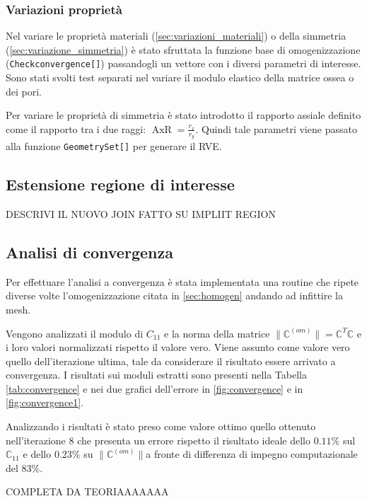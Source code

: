 \documentclass[a4paper,num-refs]{oup-contemporary}
\begin{document}
\subsubsection{Variazioni proprietà}

Nel variare le proprietà materiali (\cref{sec:variazioni_materiali}) o della simmetria (\cref{sec:variazione_simmetria}) è stato sfruttata la funzione base di omogenizzazione (\texttt{Checkconvergence[]}) passandogli un vettore con i diversi parametri di interesse. Sono stati svolti test separati nel variare il modulo elastico della matrice ossea o dei pori.

Per variare le proprietà di simmetria è stato introdotto il rapporto assiale definito come il rapporto tra i due raggi: $\operatorname{AxR}=\frac{r_{x}}{r_y}$. 
Quindi tale parametri viene passato alla funzione \texttt{GeometrySet[]} per generare il RVE. 

\subsection{Estensione regione di interesse}

DESCRIVI IL NUOVO JOIN FATTO SU IMPLIIT REGION


\subsection{Analisi di convergenza}
\label{sec:convergenza}

Per effettuare l'analisi a convergenza è stata implementata una routine che ripete diverse volte l'omogenizzazione citata in \cref{sec:homogen} andando ad infittire la mesh. 

Vengono analizzati il modulo di $C_{11}$ e la norma della matrice $\| \mathbb C^{(om)}\|=\mathbb C^T\mathbb C$ e i loro valori normalizzati rispetto il valore vero. Viene assunto come valore vero quello dell'iterazione ultima, tale da considerare il risultato essere arrivato a convergenza. 
I risultati sui moduli estratti sono presenti nella Tabella \ref{tab:convergence} e nei due grafici dell'errore in \cref{fig:convergence} e in \cref{fig:convergence1}.

Analizzando i risultati è stato preso come valore ottimo quello ottenuto nell'iterazione 8 che presenta un errore rispetto il risultato ideale dello $0.11\%$ sul $\mathbb C_{11}$ e dello $0.23\%$ su $\|\mathbb C^{(om)}\|$a fronte di differenza di impegno computazionale del $83\%$. 


COMPLETA DA TEORIAAAAAAA
\end{document}
